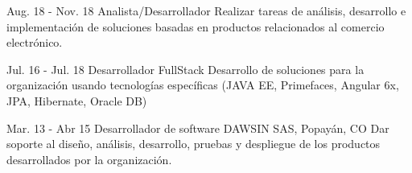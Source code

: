 \documentclass[]{cv-class}
\begin{document}
\begin{entrylist}
	\entry
	{Aug. 18 - Nov. 18}
	{Analista/Desarrollador}
	{\href{http://www.serviciosenweb.com/}{}}
	{\justifying Realizar tareas de análisis, desarrollo e implementación de soluciones basadas en productos relacionados al comercio electrónico.}
	
	\entry
	{Jul. 16 - Jul. 18}
	{Desarrollador FullStack}
	{\href{https://sitis.com.co/}{}}
	{\justifying Desarrollo de soluciones para la organización usando tecnologías específicas (JAVA EE, Primefaces, Angular 6x, JPA, Hibernate, Oracle DB)}
	
	\entry
	{Mar. 13 - Abr 15}
	{Desarrollador de software}
	{DAWSIN SAS, Popayán, CO}
	{\justifying Dar soporte al diseño, análisis, desarrollo, pruebas y despliegue de los productos desarrollados por la organización.}
\end{entrylist}
\end{document}
